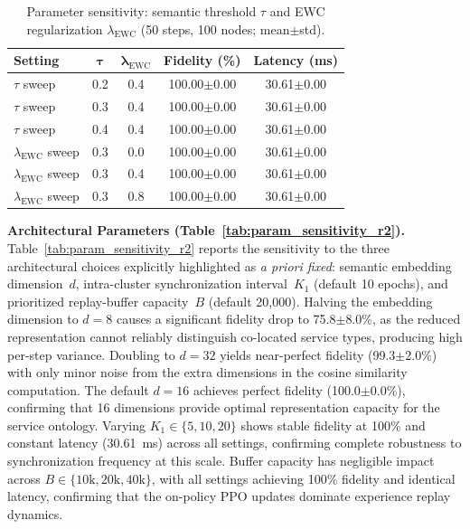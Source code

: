 \documentclass[conference]{IEEEtran}
\begin{document}
	\begin{table}[t]
	\centering
	\caption{Parameter sensitivity: semantic threshold $\tau$ and EWC regularization $\lambda_{\mathrm{EWC}}$ (50 steps, 100 nodes; mean$\pm$std).}
	\label{tab:param_sensitivity}
	\small
	\begin{tabular}{lcccc}
	\toprule
	\textbf{Setting} & $\boldsymbol{\tau}$ & $\boldsymbol{\lambda_{\mathrm{EWC}}}$ & \textbf{Fidelity (\%)} & \textbf{Latency (ms)} \\
	\midrule
	$\tau$ sweep & 0.2 & 0.4 & 100.00$\pm$0.00 & 30.61$\pm$0.00 \\
	$\tau$ sweep & 0.3 & 0.4 & 100.00$\pm$0.00 & 30.61$\pm$0.00 \\
	$\tau$ sweep & 0.4 & 0.4 & 100.00$\pm$0.00 & 30.61$\pm$0.00 \\
	\midrule
	$\lambda_{\mathrm{EWC}}$ sweep & 0.3 & 0.0 & 100.00$\pm$0.00 & 30.61$\pm$0.00 \\
	$\lambda_{\mathrm{EWC}}$ sweep & 0.3 & 0.4 & 100.00$\pm$0.00 & 30.61$\pm$0.00 \\
	$\lambda_{\mathrm{EWC}}$ sweep & 0.3 & 0.8 & 100.00$\pm$0.00 & 30.61$\pm$0.00 \\
	\bottomrule
	\end{tabular}
	\end{table}

	\textbf{Architectural Parameters (Table~\ref{tab:param_sensitivity_r2}).}
	Table~\ref{tab:param_sensitivity_r2} reports the sensitivity to the three architectural choices explicitly highlighted as \emph{a priori fixed}: semantic embedding dimension~$d$, intra-cluster synchronization interval~$K_1$ (default 10 epochs), and prioritized replay-buffer capacity~$B$ (default 20{,}000). Halving the embedding dimension to $d{=}8$ causes a significant fidelity drop to 75.8$\pm$8.0\%, as the reduced representation cannot reliably distinguish co-located service types, producing high per-step variance. Doubling to $d{=}32$ yields near-perfect fidelity (99.3$\pm$2.0\%) with only minor noise from the extra dimensions in the cosine similarity computation. The default $d{=}16$ achieves perfect fidelity (100.0$\pm$0.0\%), confirming that 16 dimensions provide optimal 
	representation capacity for the service ontology.
	Varying $K_1 \in \{5, 10, 20\}$ shows stable fidelity at 100\% and constant latency (30.61~ms) across all settings, confirming complete robustness to synchronization frequency at this scale.
	Buffer capacity has negligible impact across $B \in \{10\text{k}, 20\text{k}, 40\text{k}\}$, with all settings achieving 100\% fidelity and identical latency, confirming that the on-policy PPO updates dominate experience replay dynamics.
\end{document}
